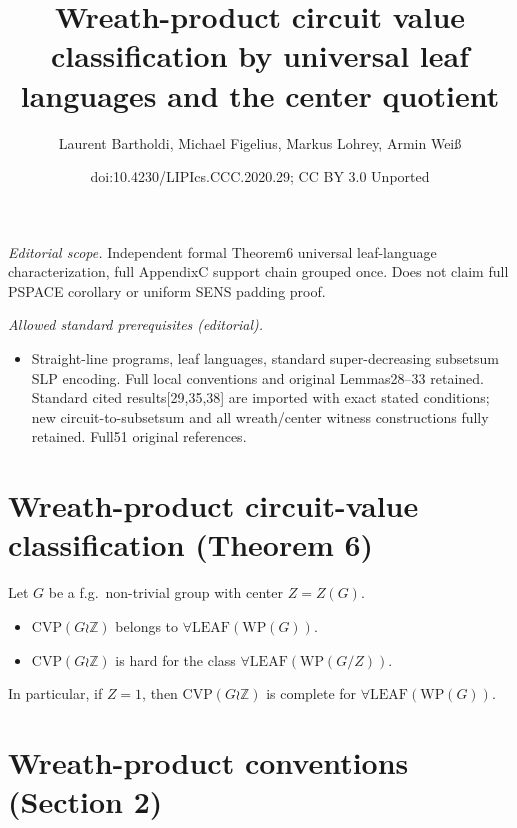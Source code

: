 \documentclass[10pt,a4paper]{article}
\title{Wreath-product circuit value classification by universal leaf languages and the center quotient}
\author{Laurent Bartholdi, Michael Figelius, Markus Lohrey, Armin Weiß}
\date{doi:10.4230/LIPIcs.CCC.2020.29; CC BY 3.0 Unported}
\begin{document}
\maketitle
\noindent\textit{Editorial scope.} Independent formal Theorem6 universal leaf-language characterization, full AppendixC support chain grouped once. Does not claim full PSPACE corollary or uniform SENS padding proof.\par\medskip
\noindent\textit{Allowed standard prerequisites (editorial).}\begin{itemize}
\item Straight-line programs, leaf languages, standard super-decreasing subsetsum SLP encoding. Full local conventions and original Lemmas28–33 retained. Standard cited results[29,35,38] are imported with exact stated conditions; new circuit-to-subsetsum and all wreath/center witness constructions fully retained. Full51 original references.
\end{itemize}\medskip
\section*{Wreath-product circuit-value classification (Theorem 6)}
Let $G$ be a f.g.\ non-trivial group with center $Z=Z(G)$.
\begin{itemize}
\item $\mathrm{CVP}(G\wr\mathbb Z)$ belongs to $\forall\mathrm{LEAF}(\mathrm{WP}(G))$.
\item $\mathrm{CVP}(G\wr\mathbb Z)$ is hard for the class $\forall\mathrm{LEAF}(\mathrm{WP}(G/Z))$.
\end{itemize}
In particular, if $Z=1$, then $\mathrm{CVP}(G\wr\mathbb Z)$ is complete for $\forall\mathrm{LEAF}(\mathrm{WP}(G))$.

\section*{Wreath-product conventions (Section 2)} \label{sec-wreath}
\end{document}
